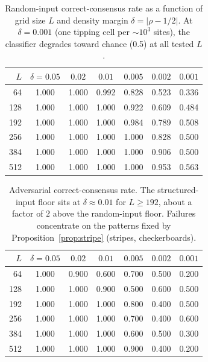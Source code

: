 \documentclass[11pt,a4paper]{article}
\begin{document}
\begin{table}[h]\centering\small
\begin{tabular}{r cccccc}
\toprule
$L$ & $\delta=0.05$ & $0.02$ & $0.01$ & $0.005$ & $0.002$ & $0.001$ \\
\midrule
64  & 1.000 & 1.000 & 0.992 & 0.828 & 0.523 & 0.336 \\
128 & 1.000 & 1.000 & 1.000 & 0.922 & 0.609 & 0.484 \\
192 & 1.000 & 1.000 & 1.000 & 0.984 & 0.789 & 0.508 \\
256 & 1.000 & 1.000 & 1.000 & 1.000 & 0.828 & 0.500 \\
384 & 1.000 & 1.000 & 1.000 & 1.000 & 0.906 & 0.500 \\
512 & 1.000 & 1.000 & 1.000 & 1.000 & 0.953 & 0.563 \\
\bottomrule
\end{tabular}
\caption{Random-input correct-consensus rate as a function of grid size
\(L\) and density margin \(\delta = |\rho-1/2|\).
At \(\delta=0.001\) (one tipping cell per \({\sim}10^3\) sites), the
classifier degrades toward chance (0.5) at all tested \(L\).}
\label{tab:rho-min-random}
\end{table}

\begin{table}[h]\centering\small
\begin{tabular}{r cccccc}
\toprule
$L$ & $\delta=0.05$ & $0.02$ & $0.01$ & $0.005$ & $0.002$ & $0.001$ \\
\midrule
64  & 1.000 & 0.900 & 0.600 & 0.700 & 0.500 & 0.200 \\
128 & 1.000 & 1.000 & 0.900 & 0.500 & 0.600 & 0.500 \\
192 & 1.000 & 1.000 & 1.000 & 0.800 & 0.400 & 0.500 \\
256 & 1.000 & 1.000 & 1.000 & 0.700 & 0.400 & 0.600 \\
384 & 1.000 & 1.000 & 1.000 & 0.600 & 0.500 & 0.300 \\
512 & 1.000 & 1.000 & 1.000 & 0.900 & 0.400 & 0.200 \\
\bottomrule
\end{tabular}
\caption{Adversarial correct-consensus rate.  The structured-input
floor sits at \(\delta\approx 0.01\) for \(L\geq 192\), about a factor of
\(2\) above the random-input floor.  Failures concentrate on the patterns
fixed by Proposition~\ref{prop:stripe} (stripes, checkerboards).}
\label{tab:rho-min-adv}
\end{table}
\end{document}
